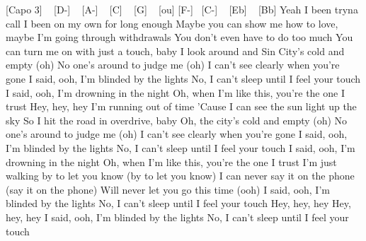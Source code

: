 [Capo 3] ~ [D-] ~ [A-] ~ [C] ~ [G] ~ [ou] 
[F-] ~[C-] ~ [Eb] ~ [Bb]
Yeah
I been tryna call
I been on my own for long enough
Maybe you can show me how to love, maybe
I'm going through withdrawals
You don't even have to do too much
You can turn me on with just a touch, baby
I look around and Sin City's cold and empty (oh)
No one's around to judge me (oh)
I can't see clearly when you're gone
I said, ooh, I'm blinded by the lights
No, I can't sleep until I feel your touch
I said, ooh, I'm drowning in the night
Oh, when I'm like this, you're the one I trust
Hey, hey, hey
I'm running out of time
'Cause I can see the sun light up the sky
So I hit the road in overdrive, baby
Oh, the city's cold and empty (oh)
No one's around to judge me (oh)
I can't see clearly when you're gone
I said, ooh, I'm blinded by the lights
No, I can't sleep until I feel your touch
I said, ooh, I'm drowning in the night
Oh, when I'm like this, you're the one I trust
I'm just walking by to let you know (by to let you know)
I can never say it on the phone (say it on the phone)
Will never let you go this time (ooh)
I said, ooh, I'm blinded by the lights
No, I can't sleep until I feel your touch
Hey, hey, hey
Hey, hey, hey
I said, ooh, I'm blinded by the lights
No, I can't sleep until I feel your touch